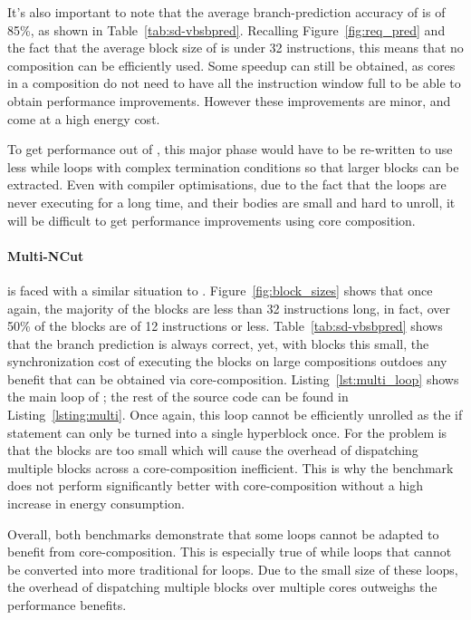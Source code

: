 It's also important to note that the average branch-prediction accuracy of  is of 85\%, as shown in Table~\ref{tab:sd-vbsbpred}.
Recalling Figure~\ref{fig:req_pred} and the fact that the average block size of  is under 32 instructions, this means that no composition can be efficiently used.
Some speedup can still be obtained, as cores in a composition do not need to have all the instruction window full to be able to obtain performance improvements.
However these improvements are minor, and come at a high energy cost.

To get performance out of , this major phase would have to be re-written to use less while loops with complex termination conditions so that larger blocks can be extracted.
Even with compiler optimisations, due to the fact that the loops are never executing for a long time, and their bodies are small and hard to unroll, it will be difficult to get performance improvements using core composition.

\paragraph*{Multi-NCut}

 is faced with a similar situation to .
Figure~\ref{fig:block_sizes} shows that once again, the majority of the blocks are less than 32 instructions long, in fact, over 50\% of the blocks are of 12 instructions or less.
Table~\ref{tab:sd-vbsbpred} shows that the branch prediction is always correct, yet, with blocks this small, the synchronization cost of executing the blocks on large compositions outdoes any benefit that can be obtained via core-composition.
Listing~\ref{lst:multi_loop} shows the main loop of ; the rest of the source code can be found in Listing~\ref{lsting:multi}.%
Once again, this loop cannot be efficiently unrolled as the if statement can only be turned into a single hyperblock once.
For  the problem is that the blocks are too small which will cause the overhead of dispatching multiple blocks across a core-composition inefficient.
This is why the benchmark does not perform significantly better with core-composition without a high increase in energy consumption.


Overall, both benchmarks demonstrate that some loops cannot be adapted to benefit from core-composition.
This is especially true of while loops that cannot be converted into more traditional for loops.
Due to the small size of these loops, the overhead of dispatching multiple blocks over multiple cores outweighs the performance benefits.